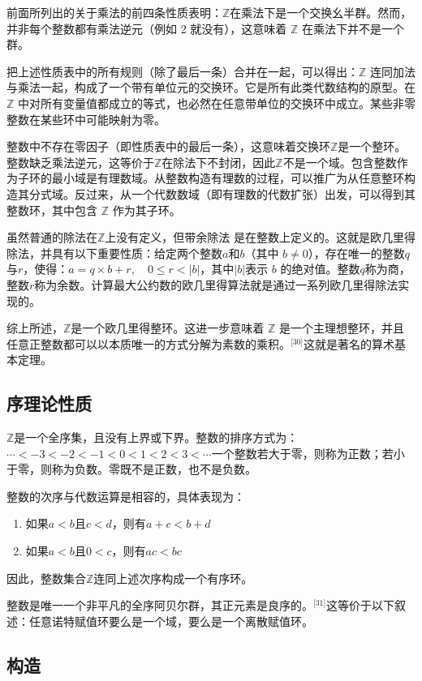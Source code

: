 前面所列出的关于乘法的前四条性质表明：$\mathbb{Z}$在乘法下是一个交换幺半群。然而，并非每个整数都有乘法逆元（例如 2 就没有），这意味着 $\mathbb{Z}$ 在乘法下并不是一个群。

把上述性质表中的所有规则（除了最后一条）合并在一起，可以得出：$\mathbb{Z}$ 连同加法与乘法一起，构成了一个带有单位元的交换环。它是所有此类代数结构的原型。在 $\mathbb{Z}$ 中对所有变量值都成立的等式，也必然在任意带单位的交换环中成立。某些非零整数在某些环中可能映射为零。

整数中不存在零因子（即性质表中的最后一条），这意味着交换环$\mathbb{Z}$是一个整环。整数缺乏乘法逆元，这等价于$\mathbb{Z}$在除法下不封闭，因此$\mathbb{Z}$不是一个域。包含整数作为子环的最小域是有理数域。从整数构造有理数的过程，可以推广为从任意整环构造其分式域。反过来，从一个代数数域（即有理数的代数扩张）出发，可以得到其整数环，其中包含 $\mathbb{Z}$ 作为其子环。

虽然普通的除法在$\mathbb{Z}$上没有定义，但带余除法 是在整数上定义的。这就是欧几里得除法，并具有以下重要性质：给定两个整数$a$和$b$（其中 $b \neq 0$），存在唯一的整数$q$与$r$，使得：$a = q \times b + r, \quad 0 \leq r < |b|$，其中$|b|$表示 $b$ 的绝对值。整数$q$称为商，整数$r$称为余数。计算最大公约数的欧几里得算法就是通过一系列欧几里得除法实现的。

综上所述，$\mathbb{Z}$是一个欧几里得整环。这进一步意味着 $\mathbb{Z}$ 是一个主理想整环，并且任意正整数都可以以本质唯一的方式分解为素数的乘积。\(^\text{[30]}\)这就是著名的算术基本定理。
\subsection{序理论性质}
$\mathbb{Z}$是一个全序集，且没有上界或下界。整数的排序方式为：$\cdots < -3 < -2 < -1 < 0 < 1 < 2 < 3 < \cdots$一个整数若大于零，则称为正数；若小于零，则称为负数。零既不是正数，也不是负数。

整数的次序与代数运算是相容的，具体表现为：
\begin{enumerate}
\item 如果$a < b$且$c < d$，则有$a + c < b + d$
\item 如果$a < b$且$0 < c$，则有$ac < bc$
\end{enumerate}
因此，整数集合$\mathbb{Z}$连同上述次序构成一个有序环。

整数是唯一一个非平凡的全序阿贝尔群，其正元素是良序的。\(^\text{[31]}\)这等价于以下叙述：任意诺特赋值环要么是一个域，要么是一个离散赋值环。
\subsection{构造}
